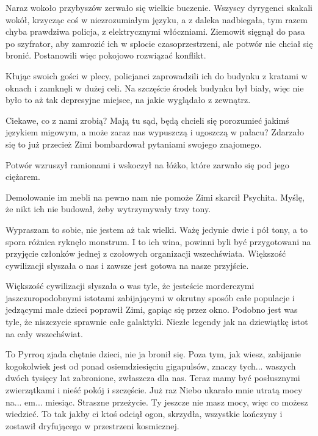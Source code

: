 Naraz wokoło przybyszów zerwało się wielkie buczenie.
Wszyscy dyrygenci skakali wokół, krzycząc coś w niezrozumiałym języku, a z daleka nadbiegała, tym razem chyba prawdziwa policja, z elektrycznymi włóczniami.
Ziemowit sięgnął do pasa po szyfrator, aby zamrozić ich w splocie czasoprzestrzeni, ale potwór nie chciał się bronić.
Postanowili więc pokojowo rozwiązać konflikt.

Kłując swoich gości w plecy, policjanci zaprowadzili ich do budynku z kratami w oknach i zamknęli w dużej celi.
Na szczęście środek budynku był biały, więc nie było to aż tak depresyjne miejsce, na jakie wyglądało z zewnątrz.

\ds{} Ciekawe, co z nami zrobią? Mają tu sąd, będą chcieli się porozumieć jakimś językiem migowym, a może zaraz nas wypuszczą i ugoszczą w pałacu? Zdarzało się to już przecież
\dm{} Zimi bombardował pytaniami swojego znajomego. \de{}

Potwór wzruszył ramionami i wskoczył na łóżko, które zarwało się pod jego ciężarem.

\ds{} Demolowanie im mebli na pewno nam nie pomoże \dm{} Zimi skarcił Psychita. \dm{} Myślę, że nikt ich nie budował, żeby wytrzymywały trzy tony. \de{}

\ds{} Wypraszam to sobie, nie jestem aż tak wielki. Ważę jedynie dwie i pół tony, a to spora różnica \dm{} ryknęło monstrum. \dm{}
I to ich wina, powinni byli być przygotowani na przyjęcie członków jednej z czołowych organizacji wszechświata. Większość cywilizacji słyszała o nas i zawsze jest gotowa na nasze przyjście. \de{}

\ds{} Większość cywilizacji słyszała o was tyle, że jesteście morderczymi jaszczuropodobnymi istotami zabijającymi w okrutny sposób całe populacje i jedzącymi małe dzieci \dm{}
poprawił Zimi, gapiąc się przez okno. \dm{} Podobno jest was tyle, że niszczycie sprawnie całe galaktyki. Niezłe legendy jak na dziewiątkę istot na cały wszechświat. \de{}

\ds{} To Pyrroq zjada chętnie dzieci, nie ja \dm{} bronił się. \dm{} Poza tym, jak wiesz, zabijanie kogokolwiek jest od ponad osiemdziesięciu gigapulsów, 
znaczy tych... waszych dwóch tysięcy lat zabronione, zwłaszcza dla nas.
Teraz mamy być posłusznymi zwierzątkami i nieść pokój i szczęście. Już raz Niebo ukarało mnie utratą mocy na... em... miesiąc. Straszne przeżycie.
Ty jeszcze nie masz mocy, więc co możesz wiedzieć. To tak jakby ci ktoś odciął ogon, skrzydła, wszystkie kończyny i zostawił dryfującego w przestrzeni kosmicznej. \de{}


